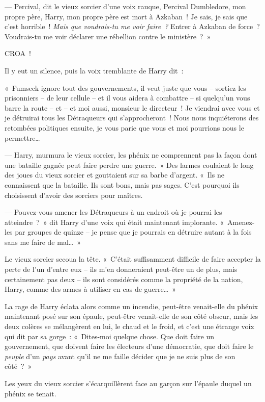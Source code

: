 --- Percival, dit le vieux sorcier d'une voix rauque, Percival Dumbledore, mon propre père, Harry, mon propre père est mort à Azkaban~!
Je sais, je sais que c'est horrible~!
\emph{Mais que voudrais-tu me voir faire~?} Entrer à Azkaban de force~?
Voudrais-tu me voir déclarer une rébellion contre le ministère~?~»

CROA~!

Il y eut un silence, puis la voix tremblante de Harry dit~:

«~Fumseck ignore tout des gouvernements, il veut juste que vous -- sortiez les prisonniers -- de leur cellule -- et il vous aidera à combattre -- si quelqu'un vous barre la route -- et -- et moi aussi, monsieur le directeur~!
Je viendrai avec vous et je détruirai tous les Détraqueurs qui s'approcheront~!
Nous nous inquiéterons des retombées politiques ensuite, je vous parie que vous et moi pourrions nous le permettre…

--- Harry, murmura le vieux sorcier, les phénix ne comprennent pas la façon dont une bataille gagnée peut faire perdre une guerre.~»
Des larmes coulaient le long des joues du vieux sorcier et gouttaient sur sa barbe d'argent.
«~Ils ne connaissent que la bataille.
Ils sont bons, mais pas sages.
C'est pourquoi ils choisissent d'avoir des sorciers pour maîtres.

--- Pouvez-vous amener les Détraqueurs à un endroit où je pourrai les atteindre~?~»
dit Harry d'une voix qui était maintenant implorante.
«~Amenez-les par groupes de quinze -- je pense que je pourrais en détruire autant à la fois sans me faire de mal…~»

Le vieux sorcier secoua la tête.
«~C'était suffisamment difficile de faire accepter la perte de l'un d'entre eux -- ils m'en donneraient peut-être un de plus, mais certainement pas deux -- ils sont considérés comme la propriété de la nation, Harry, comme des armes à utiliser en cas de guerre…~»

La rage de Harry éclata alors comme un incendie, peut-être venait-elle du phénix maintenant posé sur son épaule, peut-être venait-elle de son côté obscur, mais les deux colères se mélangèrent en lui, le chaud et le froid, et c'est une étrange voix qui dit par sa gorge~: «~Dites-moi quelque chose.
Que doit faire un gouvernement, que doivent faire les électeurs d'une démocratie, que doit faire le \emph{peuple} d'un \emph{pays} avant qu'il ne me faille décider que je ne suis plus de son côté~?~»

Les yeux du vieux sorcier s'écarquillèrent face au garçon sur l'épaule duquel un phénix se tenait.

